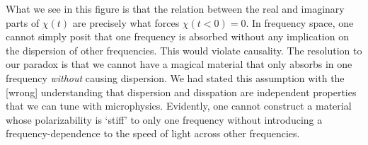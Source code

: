 What we see in this figure is that the relation between the real and imaginary parts of $\chi(t)$ are precisely what forces $\chi(t<0) = 0$. In frequency space, one cannot simply posit that one frequency is absorbed without any implication on the dispersion of other frequencies. This would violate causality. The resolution to our paradox is that we cannot have a magical material that only absorbs in one frequency \emph{without} causing dispersion. We had stated this assumption with the [wrong] understanding that dispersion and disspation are independent properties that we can tune with microphysics. Evidently, one cannot construct a material whose polarizability is `stiff' to only one frequency without introducing a frequency-dependence to the speed of light across other frequencies.





